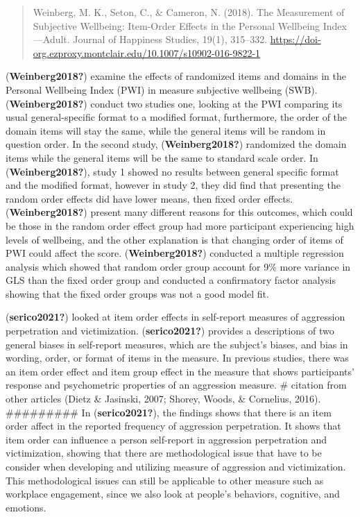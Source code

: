 \documentclass[
  man]{apa7}
\begin{document}
\begin{quote}
Weinberg, M. K., Seton, C., \& Cameron, N. (2018). The Measurement of Subjective Wellbeing: Item-Order Effects in the Personal Wellbeing Index---Adult. Journal of Happiness Studies, 19(1), 315--332. \url{https://doi-org.ezproxy.montclair.edu/10.1007/s10902-016-9822-1}
\end{quote}

(\textbf{Weinberg2018?}) examine the effects of randomized items and domains in the Personal Wellbeing Index (PWI) in measure subjective wellbeing (SWB). (\textbf{Weinberg2018?}) conduct two studies one, looking at the PWI comparing its usual general-specific format to a modified format, furthermore, the order of the domain items will stay the same, while the general items will be random in question order. In the second study, (\textbf{Weinberg2018?}) randomized the domain items while the general items will be the same to standard scale order. In (\textbf{Weinberg2018?}), study 1 showed no results between general specific format and the modified format, however in study 2, they did find that presenting the random order effects did have lower means, then fixed order effects. (\textbf{Weinberg2018?}) present many different reasons for this outcomes, which could be those in the random order effect group had more participant experiencing high levels of wellbeing, and the other explanation is that changing order of items of PWI could affect the score. (\textbf{Weinberg2018?}) conducted a multiple regression analysis which showed that random order group account for 9\% more variance in GLS than the fixed order group and conducted a confirmatory factor analysis showing that the fixed order groups was not a good model fit.

(\textbf{serico2021?}) looked at item order effects in self-report measures of aggression perpetration and victimization. (\textbf{serico2021?}) provides a descriptions of two general biases in self-report measures, which are the subject's biases, and bias in wording, order, or format of items in the measure. In previous studies, there was an item order effect and item group effect in the measure that shows participants' response and psychometric properties of an aggression measure. \# citation from other articles (Dietz \& Jasinski, 2007; Shorey, Woods, \& Cornelius, 2016). \#\#\#\#\#\#\#\#\# In (\textbf{serico2021?}), the findings shows that there is an item order affect in the reported frequency of aggression perpetration. It shows that item order can influence a person self-report in aggression perpetration and victimization, showing that there are methodological issue that have to be consider when developing and utilizing measure of aggression and victimization. This methodological issues can still be applicable to other measure such as workplace engagement, since we also look at people's behaviors, cognitive, and emotions.
\end{document}
